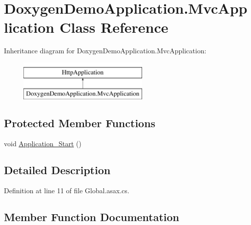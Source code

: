 \hypertarget{class_doxygen_demo_application_1_1_mvc_application}{}\section{Doxygen\+Demo\+Application.\+Mvc\+Application Class Reference}
\label{class_doxygen_demo_application_1_1_mvc_application}
Inheritance diagram for Doxygen\+Demo\+Application.\+Mvc\+Application\+:\begin{figure}[H]
\begin{center}
\leavevmode
\includegraphics[height=2.000000cm]{class_doxygen_demo_application_1_1_mvc_application}
\end{center}
\end{figure}
\subsection*{Protected Member Functions}
\begin{DoxyCompactItemize}
\item 
void \mbox{\hyperlink{class_doxygen_demo_application_1_1_mvc_application_a65c33faea17a0f68997fc321fdeab52b}{Application\+\_\+\+Start}} ()
\end{DoxyCompactItemize}


\subsection{Detailed Description}


Definition at line 11 of file Global.\+asax.\+cs.



\subsection{Member Function Documentation}
\mbox{\label{class_doxygen_demo_application_1_1_mvc_application_a65c33faea17a0f68997fc321fdeab52b}} 
